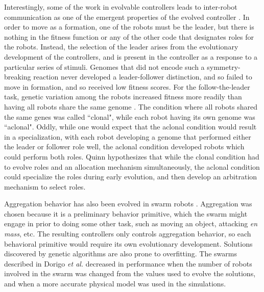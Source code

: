 \documentclass[]{article}
\begin{document}
Interestingly, some of the work in evolvable controllers leads to inter-robot communication as one of the emergent properties of the evolved controller \cite{quinn2001evolving}.
In order to move as a formation, one of the robots must be the leader, but there is nothing in the fitness function or any of the other code that designates roles for the robots. 
Instead, the selection of the leader arises from the evolutionary development of the controllers, and is present in the controller as a response to a particular series of stimuli. 
Genomes that did not encode such a symmetry-breaking reaction never developed a leader-follower distinction, and so failed to move in formation, and so received low fitness scores. 
For the follow-the-leader task, genetic variation among the robots increased fitness more readily than having all robots share the same genome \cite{quinn2001comparison}.
The condition where all robots shared the same genes was called ``clonal", while each robot having its own genome was ``aclonal".
Oddly, while one would expect that the aclonal condition would result in a specialization, with each robot developing a genome that performed either the leader or follower role well, the aclonal condition developed robots which could perform both roles. 
Quinn hypothesizes that while the clonal condition had to evolve roles and an allocation mechanism simultaneously, the aclonal condition could specialize the roles during early evolution, and then develop an arbitration mechanism to select roles.

Aggregation behavior has also been evolved in swarm robots \cite{bahgecci2005evolving, dorigo2004evolving}.  
Aggregation was chosen because it is a preliminary behavior primitive, which the swarm might engage in prior to doing some other task, such as moving an object, attacking \emph{en mass}, etc.
The resulting controllers only controls aggregation behavior, so each behavioral primitive would require its own evolutionary development. 
Solutions discovered by genetic algorithms are also prone to overfitting. 
The swarms described in Dorigo \emph{et al.} decreased in performance when the number of robots involved in the swarm was changed from the values used to evolve the solutions, and when a more accurate physical model was used in the simulations.
\end{document}

